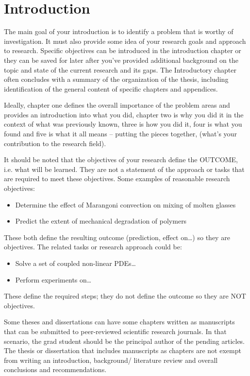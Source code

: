 \chapter{Introduction} \label{sectionIntroduction}

The main goal of your introduction is to identify a problem that is worthy of investigation. It must also provide some idea of your research goals and approach to research.  Specific objectives can be introduced in the introduction chapter or they can be saved for later after you’ve provided additional background on the topic and state of the current research and its gaps.  The Introductory chapter often concludes with a summary of the organization of the thesis, including identification of the general content of specific chapters and appendices.

Ideally, chapter one defines the overall importance of the problem areas and provides an introduction into what you did, chapter two is why you did it in the context of what was previously known, three is how you did it, four is what you found and five is what it all means – putting the pieces together, (what’s your contribution to the research field).

It should be noted that the objectives of your research define the OUTCOME, i.e. what will be learned.  They are not a statement of the approach or tasks that are required to meet these objectives.  Some examples of reasonable research objectives:

\begin{itemize}
  \item Determine the effect of Marangoni convection on mixing of molten glasses
  \item Predict the extent of mechanical degradation of polymers
\end{itemize}

These both define the resulting outcome (prediction, effect on…) so they are objectives. The related tasks or research approach could be:

\begin{itemize}
  \item Solve a set of coupled non-linear PDEs\dots
  \item Perform experiments on\dots
\end{itemize}

These define the required steps; they do not define the outcome so they are NOT objectives.

Some theses and dissertations can have some chapters written as manuscripts that can be submitted to peer-reviewed scientific research journals. In that scenario, the grad student should be the principal author of the pending articles. The thesis or dissertation that includes manuscripts as chapters are not exempt from writing an introduction, background/ literature review and overall conclusions and recommendations.

